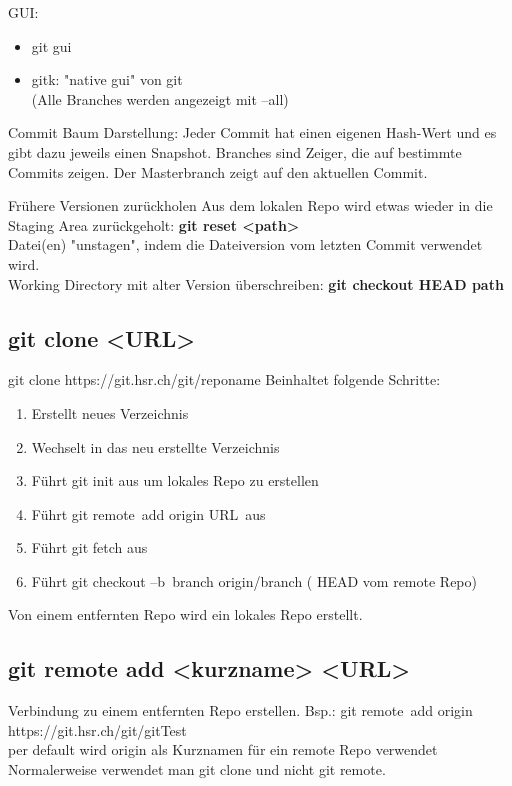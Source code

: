 GUI: 
\begin{itemize}
	\item git gui
	\item gitk: "native gui" von git \\
	(Alle Branches werden angezeigt mit --all)
\end{itemize}

Commit Baum Darstellung: Jeder Commit hat einen eigenen Hash-Wert und es gibt dazu jeweils einen Snapshot. Branches sind Zeiger, die auf bestimmte Commits zeigen. Der Masterbranch zeigt auf den aktuellen Commit. 

Frühere Versionen zurückholen
Aus dem lokalen Repo wird etwas wieder in die Staging Area zurückgeholt: \textbf{git reset <path>} \\
Datei(en) "unstagen", indem die Dateiversion vom letzten Commit verwendet wird.  \\
Working Directory mit alter Version überschreiben: \textbf{git checkout HEAD path}

\subsection{git clone <URL>}
git clone https://git.hsr.ch/git/reponame
Beinhaltet folgende Schritte:
\begin{enumerate}
	\item Erstellt neues Verzeichnis
	\item Wechselt in das neu erstellte Verzeichnis
	\item Führt git init aus um lokales Repo zu erstellen
	\item Führt git remote add origin URL aus
	\item Führt git fetch aus
	\item Führt git checkout –b branch
	origin/branch ( HEAD vom remote Repo)
\end{enumerate}
Von einem entfernten Repo wird ein lokales Repo erstellt.

\subsection{git remote add <kurzname> <URL>}
Verbindung zu einem entfernten Repo erstellen. Bsp.: git remote add origin https://git.hsr.ch/git/gitTest \\
per default wird origin als Kurznamen für ein 
remote Repo verwendet \\
Normalerweise verwendet man git clone und nicht git remote. \\

